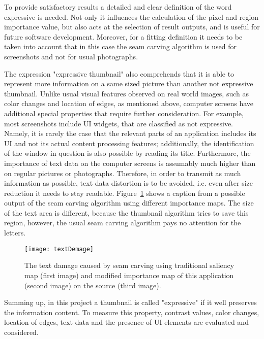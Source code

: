 \documentclass[draft,final]{vutinfth} %
\begin{document}
	To provide satisfactory results a detailed and clear definition of the word expressive is needed.
	Not only it influences the calculation of the pixel and region importance value, but also acts at the selection of result outputs, and is useful for future software development.
	Moreover, for a fitting definition it needs to be taken into account that in this case the seam carving algorithm is used for screenshots and not for usual photographs.\par 
	The expression "expressive thumbnail" also comprehends that it is able to represent more information on a same sized picture than another not expressive thumbnail.
	Unlike usual visual features observed on real world images, such as color changes and location of edges, as mentioned above, computer screens have additional special properties that require further consideration.
	For example, most screenshots include UI widgets, that are classified as not expressive.
	Namely, it is rarely the case that the relevant parts of an application includes its UI and not its actual content processing features; additionally, the identification of the window in question is also possible by reading its title.
	Furthermore, the importance of text data on the computer screens is assumably much higher than on regular pictures or photographs. 
	Therefore, in order to transmit as much information as possible, text data distortion is to be avoided, i.e. even after size reduction it needs to stay readable.
	Figure~\ref{fig:textDamage} shows a caption from a possible output of the seam carving algorithm using different importance maps.
	The size of the text area is different, because the thumbnail algorithm tries to save this region, however, the usual seam carving algorithm pays no attention for the letters.\par 
	\begin{figure}[H]
		\centering		
		\texttt{[image: textDemage]}
		\caption{The text damage caused by seam carving using traditional saliency map (first image) and modified importance map of this application (second image) on the source (third image). }
		\label{fig:textDamage}
	\end{figure} 
	Summing up, in this project a thumbnail is called "expressive" if it well preserves the information content.
	To measure this property, contrast values, color changes, location of edges, text data and the presence of UI elements are evaluated and considered. 
	
\end{document}
